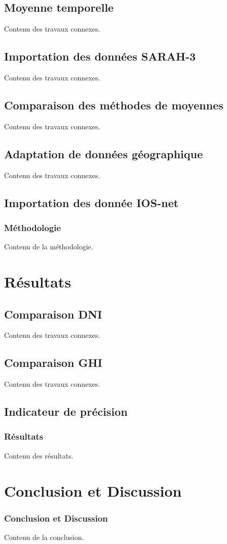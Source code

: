 \documentclass{beamer}
\begin{document}
\subsection{Moyenne temporelle}
\begin{frame}
	Contenu des travaux connexes.
\end{frame}
\subsection{Importation des données SARAH-3}
\begin{frame}
	Contenu des travaux connexes.
\end{frame}
\subsection{Comparaison des méthodes de moyennes}
\begin{frame}
	Contenu des travaux connexes.
\end{frame}
\subsection{Adaptation de données géographique}
\begin{frame}
	Contenu des travaux connexes.
\end{frame}
\subsection{Importation des donnée IOS-net}
\begin{frame}
	\frametitle{Méthodologie}
	Contenu de la méthodologie.
\end{frame}

\section{Résultats}
\subsection{Comparaison DNI}
\begin{frame}
	Contenu des travaux connexes.
\end{frame}
\subsection{Comparaison GHI}
\begin{frame}
	Contenu des travaux connexes.
\end{frame}
\subsection{Indicateur de précision}
\begin{frame}
	\frametitle{Résultats}
	Contenu des résultats.
\end{frame}

\section{Conclusion et Discussion}
\begin{frame}
	\frametitle{Conclusion et Discussion}
	Contenu de la conclusion.
\end{frame}
	
\end{document}
